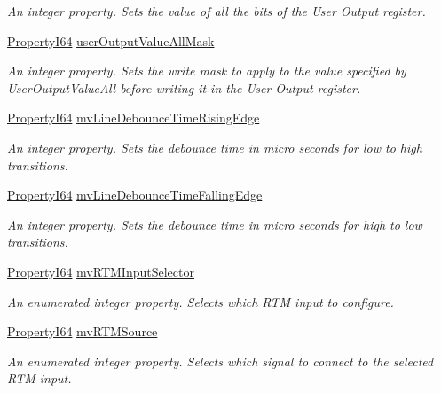 \begin{DoxyCompactItemize}
\begin{DoxyCompactList}\small\item\em An integer property. Sets the value of all the bits of the User Output register. \end{DoxyCompactList}\item 
\hyperlink{group___common_interface_ga81749b2696755513663492664a18a893}{Property\+I64} \hyperlink{classmv_i_m_p_a_c_t_1_1acquire_1_1_gen_i_cam_1_1_digital_i_o_control_aa33c5e4bfa78eb795e30bcdce7c72180}{user\+Output\+Value\+All\+Mask}
\begin{DoxyCompactList}\small\item\em An integer property. Sets the write mask to apply to the value specified by User\+Output\+Value\+All before writing it in the User Output register. \end{DoxyCompactList}\item 
\hyperlink{group___common_interface_ga81749b2696755513663492664a18a893}{Property\+I64} \hyperlink{classmv_i_m_p_a_c_t_1_1acquire_1_1_gen_i_cam_1_1_digital_i_o_control_aeaf56d4b22274bef29f4b24d2ee8047a}{mv\+Line\+Debounce\+Time\+Rising\+Edge}
\begin{DoxyCompactList}\small\item\em An integer property. Sets the debounce time in micro seconds for low to high transitions. \end{DoxyCompactList}\item 
\hyperlink{group___common_interface_ga81749b2696755513663492664a18a893}{Property\+I64} \hyperlink{classmv_i_m_p_a_c_t_1_1acquire_1_1_gen_i_cam_1_1_digital_i_o_control_aa75bce21349d5f1d97ac09495d8b0edb}{mv\+Line\+Debounce\+Time\+Falling\+Edge}
\begin{DoxyCompactList}\small\item\em An integer property. Sets the debounce time in micro seconds for high to low transitions. \end{DoxyCompactList}\item 
\hyperlink{group___common_interface_ga81749b2696755513663492664a18a893}{Property\+I64} \hyperlink{classmv_i_m_p_a_c_t_1_1acquire_1_1_gen_i_cam_1_1_digital_i_o_control_adb3910b12f431df5027cf4edbce49040}{mv\+R\+T\+M\+Input\+Selector}
\begin{DoxyCompactList}\small\item\em An enumerated integer property. Selects which R\+T\+M input to configure. \end{DoxyCompactList}\item 
\hyperlink{group___common_interface_ga81749b2696755513663492664a18a893}{Property\+I64} \hyperlink{classmv_i_m_p_a_c_t_1_1acquire_1_1_gen_i_cam_1_1_digital_i_o_control_afbac9e850186a10d255032480059c308}{mv\+R\+T\+M\+Source}
\begin{DoxyCompactList}\small\item\em An enumerated integer property. Selects which signal to connect to the selected R\+T\+M input. \end{DoxyCompactList}\end{DoxyCompactItemize}


